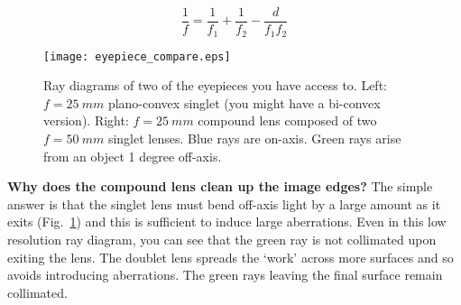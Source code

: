 \documentclass[a4paper]{report}
\begin{document}
	\begin{equation}
	\frac{1}{f} = \frac{1}{f_1} + \frac{1}{f_2} - \frac{d}{f_1f_2}
	\label{eq:compoundLensF}
	\end{equation}
	
	
	\begin{figure}[h]
		\center
		\texttt{[image: eyepiece\_compare.eps]}
		\caption{Ray diagrams of two of the eyepieces you have access to. Left: $f=25~mm$ plano-convex singlet (you might have a bi-convex version). 
			Right: $f=25~mm$ compound lens composed of two $f=50~mm$ singlet lenses. 
			Blue rays are on-axis. 
			Green rays arise from an object 1 degree off-axis. }
		\label{fig:composite}
	\end{figure}
	
	
	\textbf{Why does the compound lens clean up the image edges?} 
	The simple answer is that the singlet lens must bend off-axis light by a large amount as it exits (Fig.~\ref{fig:composite}) and this is sufficient to induce large aberrations. 
	Even in this low resolution ray diagram, you can see that the green ray is not collimated upon exiting the lens.
	The doublet lens spreads the `work' across more surfaces and so avoids introducing aberrations. 
	The green rays leaving the final surface remain collimated. 
	
	
	
\end{document}
